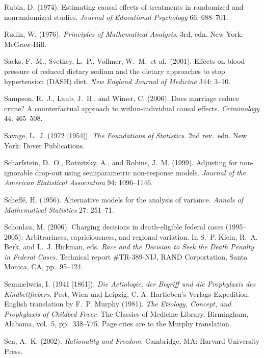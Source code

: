 \smallskip\noindent
Rubin, D. (1974).
Estimating causal effects of treatments in randomized and nonrandomized studies.
{\it Journal of Educational Psychology\/} 66: 688--701.

\smallskip\noindent
Rudin, W. (1976).
{\it Principles of Mathematical Analysis\/}. 3rd. edn.
New York: McGraw-Hill.

\smallskip\noindent
Sacks, F.~M., Svetkey, L.~P., Vollmer, W.~M.~et al.~(2001).
Effects on blood pressure of reduced dietary sodium and the
dietary approaches to stop hypertension (DASH) diet.
{\it New England Journal of Medicine\/} 344: 3--10.

\smallskip\noindent
Sampson, R.~J., Laub, J.~H., and Wimer, C. (2006).
Does marriage reduce crime? A counterfactual approach to within-individual causal effects.
{\it Criminology} 44: 465--508.

\smallskip\noindent
Savage, L.~J. (1972 [1954]).
{\it  The Foundations of Statistics\/}. 2nd rev.~edn.
New York: Dover Publications.

\smallskip\noindent
Scharfstein, D.~O., Rotnitzky, A., and Robins, J.~M. (1999).
Adjusting for non-ignorable drop-out using semiparametric non-response models.
{\it Journal of the American Statistical Association\/} 94: 1096--1146.

\smallskip\noindent
Scheff\'e, H. (1956).
Alternative models for the analysis of variance.
{\it Annals of Mathematical Statistics\/} 27: 251--71.

{
\smallskip\noindent
Schonlau, M. (2006).
Charging decisions in death-eligible federal cases (1995--2005):
Arbitrariness, capriciousness, and regional variation.
In S.~P. Klein, R.~A. Berk, and L.~J. Hickman, eds.
{\it Race and the Decision to Seek the Death Penalty in Federal Cases\/}.
Technical report \#TR-389-NIJ, RAND Corportation, Santa Monica, CA, pp.~95--124.
\par}

\smallskip\noindent
Semmelweis, I. (1941 [1861]).
{\it Die Aetiologie, der Begriff und die Prophylaxis des Kindbettfiebers\/}.
Pest, Wien und Leipzig, C. A. Hartleben's Ver\-lags-Expe\-di\-tion.
English translation by F.~P. Murphy (1981).
{\it The Etiology, Concept, and Prophylaxis of Child\-bed Fever\/}.
The Classics of Medicine Library, Birmingham, Alabama, vol.~5, pp.~338--775.
Page cites are to the Murphy translation.

\smallskip\noindent
Sen, A.~K. (2002).
{\it Rationality and Freedom\/}.
Cambridge, MA: Harvard University Press.

